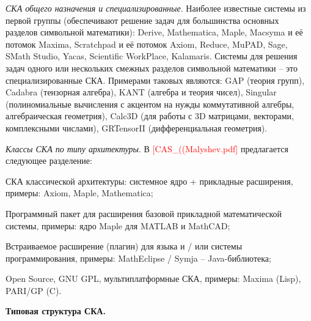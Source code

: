 \textit{СКА общего назначения и специализированные}. Наиболее известные системы из первой группы (обеспечивают решение задач для 
большинства основных разделов символьной математики): Derive, Mathematica, Maple, Macsyma и её потомок Maxima, Scratchpad и её потомок Axiom, Reduce, MuPAD, Sage, SMath Studio, Yacas, Scientific WorkPlace, Kalamaris. Системы для решения задач одного или нескольких смежных разделов символьной математики -- это специализированные СКА. Примерами таковых являются: GAP (теория групп), Cadabra (тензорная алгебра), KANT (алгебра и теория чисел), Singular (полиномиальные вычисления с акцентом на нужды коммутативной алгебры, алгебраическая геометрия), Calc3D (для работы с 3D матрицами, векторами, комплексными числами), GRTensorII (дифференциальная геометрия).

\textit{Классы СКА по типу архитектуры}. В \textcolor{red}{[CAS\_((Malyshev.pdf]} предлагается следующее разделение: 
\begin{textitemize}
	\item СКА классической 
	архитектуры: системное ядро + прикладные расширения, примеры:
	Axiom, Maple, Mathematica;
	\item Программный пакет для расширения базовой прикладной математической системы, примеры: ядро Maple для MATLAB и MathCAD;
	\item Встраиваемое расширение (плагин) для языка и / или системы программирования, примеры: MathEclipse / Symja 
	-- Java-библиотека;
	\item Open Source, GNU GPL, мультиплатформные СКА, примеры: Maxima (Lisp), PARI/GP (C).
\end{textitemize}

\textbf{Типовая структура СКА.}

